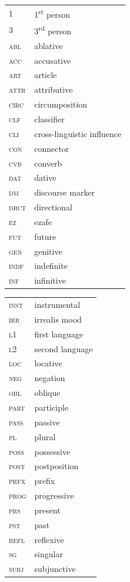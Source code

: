 \addchap{\lsAbbreviationsTitle}
\begin{tabularx}{.45\textwidth}{lQ}
1 & 1\textsuperscript{st} person   \\
3 & 3\textsuperscript{rd} person   \\
\textsc{abl} & ablative            \\
\textsc{acc} & accusative          \\
\textsc{art} & article             \\
\textsc{attr} & attributive        \\
\textsc{circ} & circumposition     \\
\textsc{clf} & classifier          \\
\textsc{cli} & cross-linguistic influence          \\
\textsc{con} & connector           \\
\textsc{cvb} & converb             \\
\textsc{dat} & dative              \\
\textsc{dm} & discourse marker     \\
\textsc{drct} & directional        \\
\textsc{ez} & ezafe                \\
\textsc{fut} & future              \\
\textsc{gen} & genitive            \\
\textsc{indf} & indefinite         \\
\textsc{inf} & infinitive          \\
\end{tabularx}
\begin{tabularx}{.45\textwidth}{lQ}
\textsc{inst} & instrumental       \\
\textsc{irr} & irrealis mood       \\
\textsc{l1} & first language          \\
\textsc{l2} & second language          \\
\textsc{loc} & locative            \\
\textsc{neg} & negation            \\
\textsc{obl} & oblique             \\
\textsc{part} & participle         \\
\textsc{pass} & passive            \\
\textsc{pl} & plural               \\
\textsc{poss} & possessive         \\
\textsc{post} & postposition       \\
\textsc{prfx} & prefix             \\
\textsc{prog} & progressive        \\
\textsc{prs} & present             \\
\textsc{pst} & past                \\
\textsc{refl} & reflexive          \\
\textsc{sg} & singular             \\
\textsc{subj} & subjunctive        \\
\end{tabularx}
